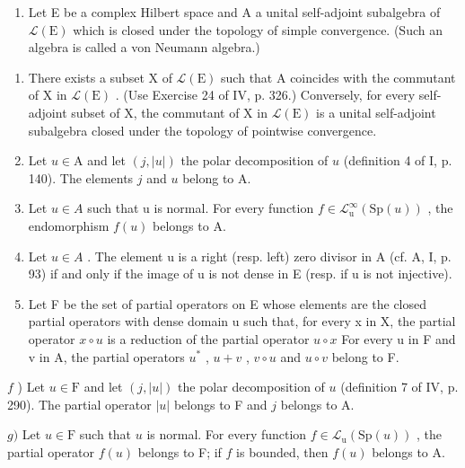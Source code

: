 \begin{enumerate}
\def\labelenumi{\arabic{enumi})}
\setcounter{enumi}{9}
\tightlist
\item
  Let E be a complex Hilbert space and A a unital self-adjoint subalgebra of \(\mathcal{L}(\mathrm{E})\) which is closed under the topology of simple convergence. (Such an algebra is called a von Neumann algebra.)
\end{enumerate}

\begin{enumerate}
\def\labelenumi{\alph{enumi})}
\item
  There exists a subset X of \(\mathcal{L}(\mathrm{E})\) such that A coincides with the commutant of X in \(\mathcal{L}(\mathrm{E})\) . (Use Exercise 24 of IV, p. 326.) Conversely, for every self-adjoint subset of X, the commutant of X in \(\mathcal{L}(\mathrm{E})\) is a unital self-adjoint subalgebra closed under the topology of pointwise convergence.
\item
  Let \(u \in \mathrm{A}\) and let \((j, |u|)\) the polar decomposition of \(u\) (definition 4 of I, p. 140). The elements \(j\) and \(u\) belong to A.
\item
  Let \(u \in A\) such that u is normal. For every function \(f \in \mathcal{L}_{\mathrm{u}}^{\infty}(\mathrm{Sp}(u))\) , the endomorphism \(f(u)\) belongs to A.
\item
  Let \(u \in A\) . The element u is a right (resp. left) zero divisor in A (cf. A, I, p. 93) if and only if the image of u is not dense in E (resp. if u is not injective).
\item
  Let F be the set of partial operators on E whose elements are the closed partial operators with dense domain u such that, for every x in X, the partial operator \(x \circ u\) is a reduction of the partial operator \(u \circ x\) For every u in F and v in A, the partial operators \(u^{*}\) , \(u + v\) , \(v \circ u\) and \(u \circ v\) belong to F.
\end{enumerate}

\(f\) ) Let \(u\in \mathrm{F}\) and let \((j,|u|)\) the polar decomposition of \(u\) (definition 7 of IV, p. 290). The partial operator \(|u|\) belongs to F and \(j\) belongs to A.

\(g)\) Let \(u \in \mathrm{F}\) such that \(u\) is normal. For every function \(f \in \mathcal{L}_{\mathrm{u}}(\mathrm{Sp}(u))\) , the partial operator \(f(u)\) belongs to F; if \(f\) is bounded, then \(f(u)\) belongs to A.

